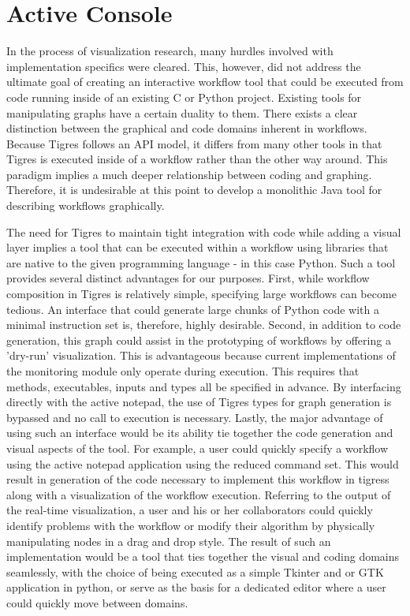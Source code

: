 \section{Active Console}
In the process of visualization research, many hurdles involved with implementation specifics were cleared. This, however, did not address the ultimate goal of creating an interactive workflow tool that could be executed from code running inside of an existing C or Python project. Existing tools for manipulating graphs have a certain duality to them. There exists a clear distinction between the graphical and code domains inherent in workflows. Because Tigres follows an API model, it differs from many other tools in that Tigres is executed inside of a workflow rather than the other way around. This paradigm implies a much deeper relationship between coding and graphing. Therefore, it is undesirable at this point to develop a monolithic Java tool for describing workflows graphically.
	
	The need for Tigres to maintain tight integration with code while adding a visual layer implies a tool that can be executed within a workflow using libraries that are native to the given programming language - in this case Python. Such a tool provides several distinct advantages for our purposes. First, while workflow composition in Tigres is relatively simple, specifying large workflows can become tedious. An interface that could generate large chunks of Python code with a minimal instruction set is, therefore, highly desirable. Second, in addition to code generation, this graph could assist in the prototyping of workflows by offering a 'dry-run' visualization. This is advantageous because current implementations of the monitoring module only operate during execution. This requires that methods, executables, inputs and types all be specified in advance. By interfacing directly with the active notepad, the use of Tigres types for graph generation is bypassed and no call to execution is necessary. Lastly, the major advantage of using such an interface would be its ability tie together the code generation and visual aspects of the tool. For example, a user could quickly specify a workflow using the active notepad application using the reduced command set. This would result in generation of the code necessary to implement this workflow in tigress along with a visualization of the workflow execution. Referring to the output of the real-time visualization, a user and his or her collaborators could quickly identify problems with the workflow or modify their algorithm by physically manipulating nodes in a drag and drop style. The result of such an implementation would be a tool that ties together the visual and coding domains seamlessly, with the choice of being executed as a simple Tkinter and or GTK application in python, or serve as the basis for a dedicated editor where a user could quickly move between domains. 
	
